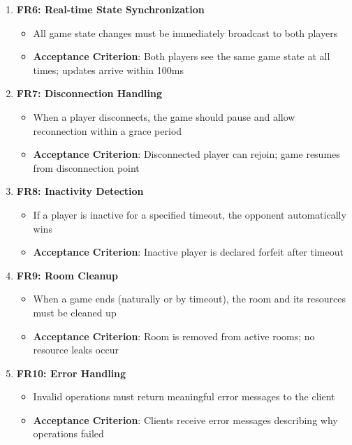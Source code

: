 \documentclass{scrartcl}
\begin{document}
\begin{enumerate}
  \item \textbf{FR6: Real-time State Synchronization}
  \begin{itemize}
    \item All game state changes must be immediately broadcast to both players
    \item \textbf{Acceptance Criterion}: Both players see the same game state at all times;
      updates arrive within 100ms
  \end{itemize}

  \item \textbf{FR7: Disconnection Handling}
  \begin{itemize}
    \item When a player disconnects, the game should pause and allow reconnection within a grace period
    \item \textbf{Acceptance Criterion}: Disconnected player can rejoin;
      game resumes from disconnection point
  \end{itemize}

  \item \textbf{FR8: Inactivity Detection}
  \begin{itemize}
    \item If a player is inactive for a specified timeout, the opponent automatically wins
    \item \textbf{Acceptance Criterion}: Inactive player is declared forfeit after timeout
  \end{itemize}

  \item \textbf{FR9: Room Cleanup}
  \begin{itemize}
    \item When a game ends (naturally or by timeout), the room and its resources must be cleaned up
    \item \textbf{Acceptance Criterion}: Room is removed from active rooms;
      no resource leaks occur
  \end{itemize}

  \item \textbf{FR10: Error Handling}
  \begin{itemize}
    \item Invalid operations must return meaningful error messages to the client
    \item \textbf{Acceptance Criterion}: Clients receive error messages describing why operations failed
  \end{itemize}
\end{enumerate}
\end{document}
